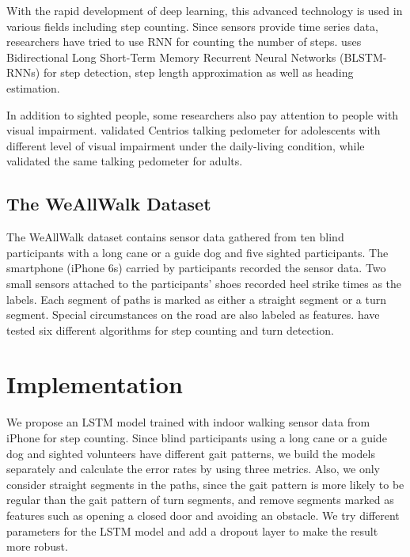 \documentclass[11pt]{article}
\begin{document}
{With the rapid development of deep learning, this advanced technology is used in various fields including step counting. Since sensors provide time series data, researchers have tried to use RNN for counting the number of steps. \cite{edel2015advanced} uses Bidirectional Long Short-Term Memory Recurrent Neural Networks (BLSTM-RNNs) for step detection, step length approximation as well as heading estimation.

In addition to sighted people, some researchers also pay attention to people with visual impairment. \cite{haegele2015validation} validated Centrios talking pedometer for adolescents with different level of visual impairment under the daily-living condition, while  \cite{holbrook2011validation} validated the same talking pedometer for adults.



\subsection{The WeAllWalk Dataset}

The WeAllWalk dataset \cite{flores2016weallwalk} contains sensor data gathered from ten blind participants with a long cane or a guide dog and five sighted participants. The smartphone (iPhone 6s) carried by participants recorded the sensor data. Two small sensors attached to the participants’ shoes recorded heel strike times as the labels. Each segment of paths is marked as either a straight segment or a turn segment. Special circumstances on the road are also labeled as features. \cite{flores2016weallwalk} have tested six different algorithms for step counting and turn detection. 


\section{Implementation}
We propose an LSTM model trained with indoor walking sensor data from iPhone for step counting. Since blind participants using a long cane or a guide dog and sighted volunteers have different gait patterns, we build the models separately and calculate the error rates by using three metrics. Also, we only consider straight segments in the paths, since the gait pattern is more likely to be regular than the gait pattern of turn segments, and remove segments marked as features such as opening a closed door and avoiding an obstacle. We try different parameters for the LSTM model and add a dropout layer to make the result more robust.

}
\end{document}
